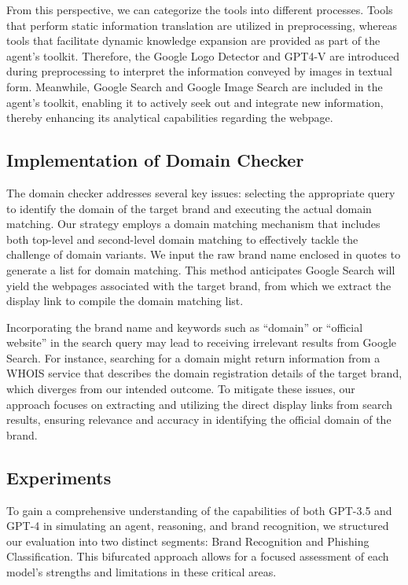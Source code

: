 From this perspective, we can categorize the tools into different processes. Tools that perform static information translation are utilized in preprocessing, whereas tools that facilitate dynamic knowledge expansion are provided as part of the agent's toolkit. Therefore, the Google Logo Detector and GPT4-V are introduced during preprocessing to interpret the information conveyed by images in textual form. Meanwhile, Google Search and Google Image Search are included in the agent's toolkit, enabling it to actively seek out and integrate new information, thereby enhancing its analytical capabilities regarding the webpage.

\subsection{Implementation of Domain Checker}

The domain checker addresses several key issues: selecting the appropriate query to identify the domain of the target brand and executing the actual domain matching. Our strategy employs a domain matching mechanism that includes both top-level and second-level domain matching to effectively tackle the challenge of domain variants. We input the raw brand name enclosed in quotes to generate a list for domain matching. This method anticipates Google Search will yield the webpages associated with the target brand, from which we extract the display link to compile the domain matching list.

Incorporating the brand name and keywords such as ``domain'' or ``official website'' in the search query may lead to receiving irrelevant results from Google Search. For instance, searching for a domain might return information from a WHOIS service that describes the domain registration details of the target brand, which diverges from our intended outcome. To mitigate these issues, our approach focuses on extracting and utilizing the direct display links from search results, ensuring relevance and accuracy in identifying the official domain of the brand.


\subsection{Experiments}

To gain a comprehensive understanding of the capabilities of both GPT-3.5 and GPT-4 in simulating an agent, reasoning, and brand recognition, we structured our evaluation into two distinct segments: Brand Recognition and Phishing Classification. This bifurcated approach allows for a focused assessment of each model's strengths and limitations in these critical areas. 

